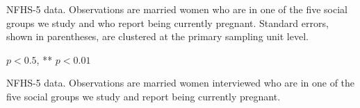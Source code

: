 \documentclass[12pt]{article}
\begin{document}
\begin{table}[H]

\begin{threeparttable}
    
    \centering
    \scriptsize %
    
    \caption{: Women reporting one or two months of pregnancy are different than those reporting three or more months of pregnancy}
    \label{regression3plusmopreg}
    \setlength{\tabcolsep}{1pt}
    \renewcommand{\arraystretch}{1.4}
    {}
    \begin{tablenotes}
        \item NFHS-5 data. Observations are married women who are in one of the five social groups we study and who report being currently pregnant. Standard errors, shown in parentheses, are clustered at the primary sampling unit level. 
        \item * $p<0.5$, ** $p<0.01$
    \end{tablenotes}
\end{threeparttable}
\end{table}



\begin{table}[H]
    \centering

    \begin{threeparttable}
            
    \caption{: Distribution of gestational ages suggests under-reporting of early pregnancy}
    \label{gestdur_distribution}
    \small
    \setlength{\tabcolsep}{5pt}
    
        
    
    \small
    \begin{tablenotes}
        \item  
    \end{tablenotes}

    \begin{tablenotes}
    \footnotesize
    \item 
        NFHS-5 data. Observations are married women interviewed who are in one of the five social groups we study and report being currently pregnant.
    \end{tablenotes}
    
    \end{threeparttable}
\end{table}
\end{document}

